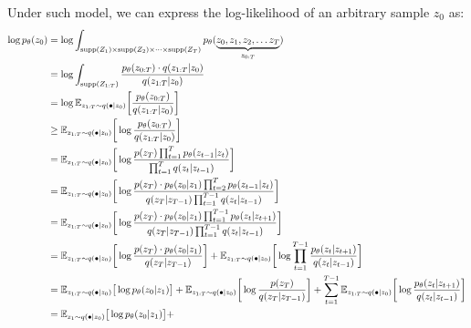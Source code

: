 Under such model, we can express the log-likelihood of an arbitrary sample \( z_0 \) as:
\begin{align}
    \log p_\theta (z_0) &= \log \int_{\supp{Z_1} \times \supp{Z_2} \times \dots \times \supp{Z_T}} p_\theta(\underbrace{z_0, z_1, z_2, \dots z_T}_{z_{0:T}}) \\
    &= \log \int_{\supp{Z_{1:T}}} \frac{p_\theta(z_{0:T}) \cdot q(z_{1:T} \vert z_0)}{q(z_{1:T} \vert z_0)} \label{eq:diffusion-1} \\
    &= \log \mathbb{E}_{z_{1:T} \sim q(\bullet \vert z_0)} \bigg[ \frac{p_\theta(z_{0:T})}{q(z_{1:T} \vert z_0)} \bigg] \\
    &\geq \mathbb{E}_{z_{1:T} \sim q(\bullet \vert z_0)} \bigg[ \log \frac{p_\theta(z_{0:T})}{q(z_{1:T} \vert z_0)} \bigg] \label{eq:diffusion-jensen} \\
    &= \mathbb{E}_{z_{1:T} \sim q(\bullet \vert z_0)} \bigg[ \log \frac{p(z_T) \prod_{t=1}^{T} p_\theta (z_{t-1} \vert z_t)}{\prod_{t=1}^T q(z_t \vert z_{t-1})} \bigg] \label{eq:diffusion-2} \\
    &= \mathbb{E}_{z_{1:T} \sim q(\bullet \vert z_0)} \bigg[ \log \frac{p(z_T) \cdot p_\theta (z_0 \vert z_1) \prod_{t=2}^{T} p_\theta (z_{t-1} \vert z_t)}{q(z_T \vert z_{T-1}) \prod_{t=1}^{T-1} q(z_t \vert z_{t-1})} \bigg] \label{eq:diffusion-3} \\
    &= \mathbb{E}_{z_{1:T} \sim q(\bullet \vert z_0)} \bigg[ \log \frac{p(z_T) \cdot p_\theta (z_0 \vert z_1) \prod_{t=1}^{T-1} p_\theta (z_{t} \vert z_{t+1})}{q(z_T \vert z_{T-1}) \prod_{t=1}^{T-1} q(z_t \vert z_{t-1})} \bigg] \label{eq:diffusion-4} \\
    &= 
        \mathbb{E}_{z_{1:T} \sim q(\bullet \vert z_0)} \bigg[ \log \frac{p(z_T) \cdot p_\theta (z_0 \vert z_1)}{q(z_T \vert z_{T-1})} \bigg] + 
        \mathbb{E}_{z_{1:T} \sim q(\bullet \vert z_0)} \bigg[ \log \prod_{t=1}^{T-1} \frac{p_\theta (z_{t} \vert z_{t+1})}{q(z_t \vert z_{t-1})}\bigg]
    \label{eq:diffusion-5} \\
    &=
        \mathbb{E}_{z_{1:T} \sim q(\bullet \vert z_0)} \big[ \log  p_\theta (z_0 \vert z_1) \big] + 
        \mathbb{E}_{z_{1:T} \sim q(\bullet \vert z_0)} \bigg[ \log \frac{p (z_T)}{q(z_T \vert z_{T-1})} \bigg] +
        \sum_{t=1}^{T-1} \mathbb{E}_{z_{1:T} \sim q(\bullet \vert z_0)} \bigg[ \log \frac{p_\theta (z_{t} \vert z_{t+1})}{q(z_t \vert z_{t-1})}\bigg]
    \label{eq:diffusion-6} \\
    &= 
        \mathbb{E}_{z_1 \sim q(\bullet \vert z_0)} \big[ \log  p_\theta (z_0 \vert z_1) \big] + 

\end{align}
